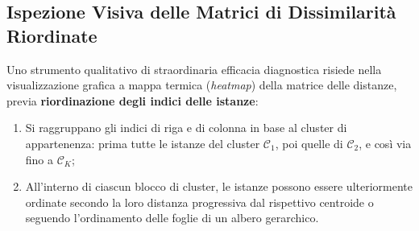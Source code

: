 \subsection{Ispezione Visiva delle Matrici di Dissimilarità Riordinate}
Uno strumento qualitativo di straordinaria efficacia diagnostica risiede nella visualizzazione grafica a mappa termica (\textit{heatmap}) della matrice delle distanze, previa \textbf{riordinazione degli indici delle istanze}:
\begin{enumerate}
    \item Si raggruppano gli indici di riga e di colonna in base al cluster di appartenenza: prima tutte le istanze del cluster $\mathcal{C}_1$, poi quelle di $\mathcal{C}_2$, e così via fino a $\mathcal{C}_K$;
    \item All'interno di ciascun blocco di cluster, le istanze possono essere ulteriormente ordinate secondo la loro distanza progressiva dal rispettivo centroide o seguendo l'ordinamento delle foglie di un albero gerarchico.
\end{enumerate}

